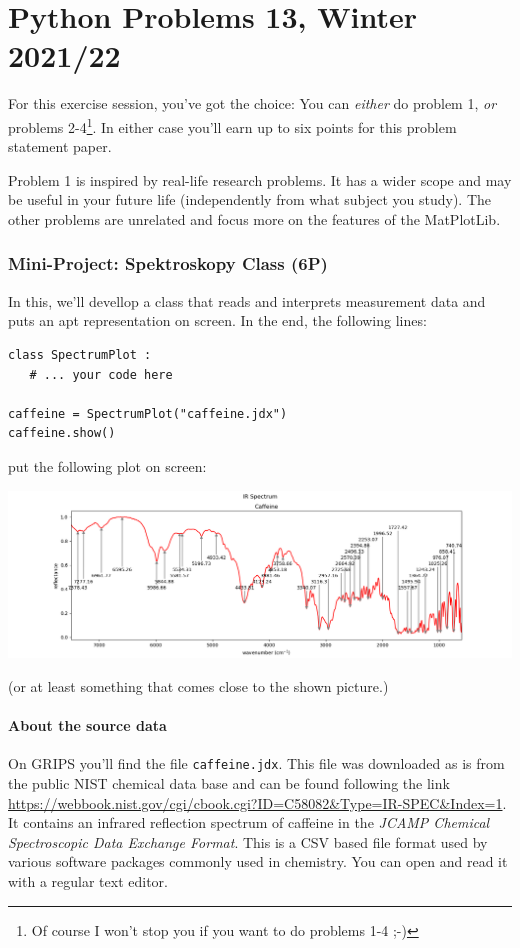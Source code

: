 \documentclass[
	english,
	fontsize=10pt,
	parskip=half,
	titlepage=true,
	DIV=12
]{scrartcl}
\begin{document}
\part*{Python Problems 13, Winter 2021/22}
For this exercise session, you've got the choice: You can \emph{either} do problem 1, \emph{or} problems 2-4\footnote{Of course I won't stop you if you want to do problems 1-4 ;-)}. In either case you'll earn up to six points for this problem statement paper.

Problem 1 is inspired by real-life research problems. It has a wider scope and may be useful in your future life (independently from what subject you study). The other problems are unrelated and focus more on the features of the MatPlotLib.

\section{Mini-Project: Spektroskopy Class (6\;P)}
In this, we'll devellop a class that reads and interprets measurement data and puts an apt representation on screen. In the end, the following lines:
\begin{verbatim}
class SpectrumPlot :
   # ... your code here

caffeine = SpectrumPlot("caffeine.jdx")
caffeine.show()
\end{verbatim}
put the following plot on screen:\\
\begin{minipage}{\linewidth}
\includegraphics[width=\linewidth]{./task1-endresult}
\label{fig:SpectrumCaffeine}
\end{minipage}

(or at least something that comes close to the shown picture.)

\subsection{About the source data}
On GRIPS you'll find the file \texttt{caffeine.jdx}. This file was downloaded as is from the public NIST chemical data base and can be found following the link \url{https://webbook.nist.gov/cgi/cbook.cgi?ID=C58082&Type=IR-SPEC&Index=1}. It contains an infrared reflection spectrum of caffeine in the \emph{JCAMP Chemical Spectroscopic Data Exchange Format}. This is a CSV based file format used by various software packages commonly used in chemistry. You can open and read it with a regular text editor.
\end{document}
